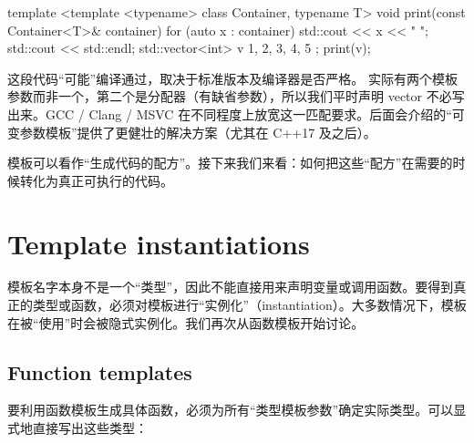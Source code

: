 \begin{code}
template <template <typename> class Container, typename T>
void print(const Container<T>& container) {
  for (auto x : container) { std::cout << x << " "; }
  std::cout << std::endl;
}
std::vector<int> v { 1, 2, 3, 4, 5 };
print(v);
\end{code}

这段代码“可能”编译通过，取决于标准版本及编译器是否严格。 实际有两个模板参数而非一个，第二个是分配器（有缺省参数），所以我们平时声明 vector 不必写出来。GCC / Clang / MSVC 在不同程度上放宽这一匹配要求。后面会介绍的“可变参数模板”提供了更健壮的解决方案（尤其在 C++17 及之后）。

模板可以看作“生成代码的配方”。接下来我们来看：如何把这些“配方”在需要的时候转化为真正可执行的代码。

\section{Template instantiations}
模板名字本身不是一个“类型”，因此不能直接用来声明变量或调用函数。要得到真正的类型或函数，必须对模板进行“实例化”（instantiation）。大多数情况下，模板在被“使用”时会被隐式实例化。我们再次从函数模板开始讨论。

\subsection{Function templates}
要利用函数模板生成具体函数，必须为所有“类型模板参数”确定实际类型。可以显式地直接写出这些类型：

